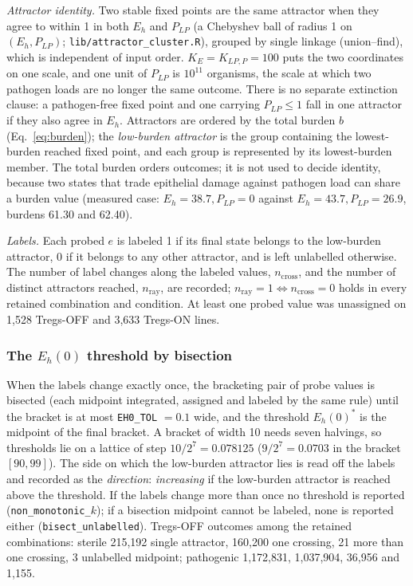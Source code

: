 \documentclass[11pt]{article}
\begin{document}
\emph{Attractor identity.} Two stable fixed points are the same attractor when they
agree to within 1 in both $E_h$ and $P_{LP}$ (a Chebyshev ball of radius 1 on
$(E_h, P_{LP})$; \texttt{lib/attractor\_cluster.R}), grouped by single linkage
(union--find), which is independent of input order. $K_E = K_{LP,P} = 100$ puts the two
coordinates on one scale, and one unit of $P_{LP}$ is $10^{11}$ organisms, the scale at
which two pathogen loads are no longer the same outcome. There is no separate
extinction clause: a pathogen-free fixed point and one carrying $P_{LP} \le 1$ fall in
one attractor if they also agree in $E_h$. Attractors are ordered by the total burden $b$ (Eq.~\ref{eq:burden}); the \emph{low-burden attractor} is the group containing the lowest-burden reached
fixed point, and each group is represented by its lowest-burden member. The
total burden orders outcomes; it is not used to decide identity, because two states that
trade epithelial damage against pathogen load can share a burden value (measured
case: $E_h = 38.7, P_{LP} = 0$ against $E_h = 43.7, P_{LP} = 26.9$, burdens 61.30 and
62.40).

\emph{Labels.} Each probed $e$ is labeled 1 if its final state belongs to the low-burden attractor,
0 if it belongs to any other attractor, and is left unlabelled otherwise. The number
of label changes along the labeled values, $n_{\mathrm{cross}}$, and the number of
distinct attractors reached, $n_{\mathrm{ray}}$, are recorded; $n_{\mathrm{ray}} = 1
\Leftrightarrow n_{\mathrm{cross}} = 0$ holds in every retained combination and
condition. At least one probed value was unassigned on 1,528 Tregs-OFF
and 3,633 Tregs-ON lines.

\subsubsection{\texorpdfstring{The $E_h(0)$ threshold by bisection}{The Eh(0) threshold by bisection}}
\label{sec:bisection}

When the labels change exactly once, the bracketing pair of probe values is bisected
(each midpoint integrated, assigned and labeled by the same rule) until the bracket is
at most \texttt{EH0\_TOL} $= 0.1$ wide, and the threshold $E_h(0)^*$ is the midpoint of
the final bracket. A bracket of width 10 needs seven halvings, so thresholds lie on a
lattice of step $10/2^7 = 0.078125$ ($9/2^7 = 0.0703$ in the bracket $[90, 99]$). The side
on which the low-burden attractor lies is read off the labels and recorded as the
\emph{direction}: \emph{increasing} if the low-burden attractor is reached above the
threshold. If the labels change more than once no threshold is reported
(\texttt{non\_monotonic\_}$k$); if a bisection midpoint cannot be labeled, none is
reported either (\texttt{bisect\_unlabelled}). Tregs-OFF outcomes among the retained
combinations: sterile 215,192 single attractor, 160,200 one crossing, 21 more than one
crossing, 3 unlabelled midpoint; pathogenic 1,172,831, 1,037,904, 36,956 and 1,155.
\end{document}
